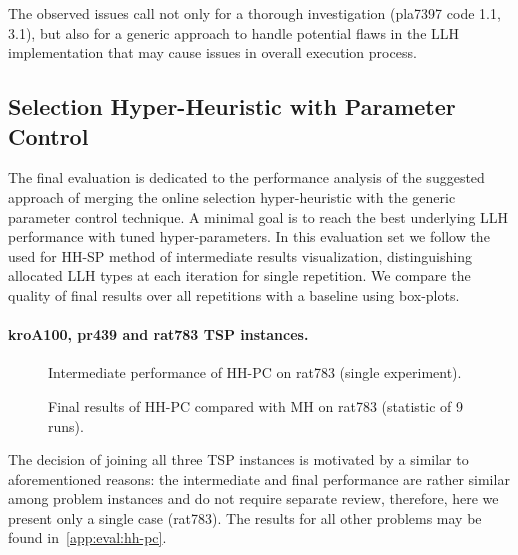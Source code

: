 The observed issues call not only for a thorough investigation (pla7397 code 1.1, 3.1), but also for a generic approach to handle potential flaws in the LLH implementation that may cause issues in overall execution process.


\subsection{Selection Hyper-Heuristic with Parameter Control}\label{eval:1:hh-pc}
The final evaluation is dedicated to the performance analysis of the suggested approach of merging the online selection hyper-heuristic with the generic parameter control technique. A minimal goal is to reach the best underlying LLH performance with tuned hyper-parameters. In this evaluation set we follow the used for HH-SP method of intermediate results visualization, distinguishing allocated LLH types at each iteration for single repetition. We compare the quality of final results over all repetitions with a baseline using box-plots.

\paragraph{kroA100, pr439 and rat783 TSP instances.}
\begin{figure}[b]
	\centering
	\vspace{-20pt}
	
	\caption{Intermediate performance of HH-PC on rat783 (single experiment).}
	\vspace{-5pt}
	\label{eval:pict:hh-pc:rat783 intermediate}
\end{figure}

\begin{figure}[t]
	\centering
	\vspace{-20pt}
	
	\caption{Final results of HH-PC compared with MH on rat783 (statistic of 9 runs).}
	\vspace{-5pt}
	\label{eval:pict:hh-pc:rat783 final}
\end{figure}

The decision of joining all three TSP instances is motivated by a similar to aforementioned reasons: the intermediate and final performance are rather similar among problem instances and do not require separate review, therefore, here we present only a single case (rat783). The results for all other problems may be found in~\cref{app:eval:hh-pc}.

